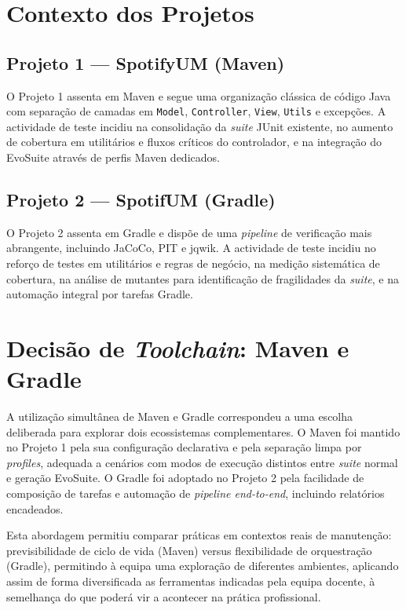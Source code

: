 \documentclass{article}
\begin{document}
\section{Contexto dos Projetos}

\subsection{Projeto 1 --- SpotifyUM (Maven)}

O Projeto 1 assenta em Maven e segue uma organização clássica de código Java com separação de camadas em \texttt{Model}, \texttt{Controller}, \texttt{View}, \texttt{Utils} e excepções. A actividade de teste incidiu na consolidação da \emph{suite} JUnit existente, no aumento de cobertura em utilitários e fluxos críticos do controlador, e na integração do EvoSuite através de perfis Maven dedicados.

\subsection{Projeto 2 --- SpotifUM (Gradle)}

O Projeto 2 assenta em Gradle e dispõe de uma \emph{pipeline} de verificação mais abrangente, incluindo JaCoCo, PIT e jqwik. A actividade de teste incidiu no reforço de testes em utilitários e regras de negócio, na medição sistemática de cobertura, na análise de mutantes para identificação de fragilidades da \emph{suite}, e na automação integral por tarefas Gradle.

\section{Decisão de \emph{Toolchain}: Maven e Gradle}

A utilização simultânea de Maven e Gradle correspondeu a uma escolha deliberada para explorar dois ecossistemas complementares. O Maven foi mantido no Projeto 1 pela sua configuração declarativa e pela separação limpa por \emph{profiles}, adequada a cenários com modos de execução distintos entre \emph{suite} normal e geração EvoSuite. O Gradle foi adoptado no Projeto 2 pela facilidade de composição de tarefas e automação de \emph{pipeline end-to-end}, incluindo relatórios encadeados.

Esta abordagem permitiu comparar práticas em contextos reais de manutenção: previsibilidade de ciclo de vida (Maven) versus flexibilidade de orquestração (Gradle), permitindo à equipa uma exploração de diferentes ambientes, aplicando assim de forma diversificada as ferramentas indicadas pela equipa docente, à semelhança do que poderá vir a acontecer na prática profissional.
\end{document}
